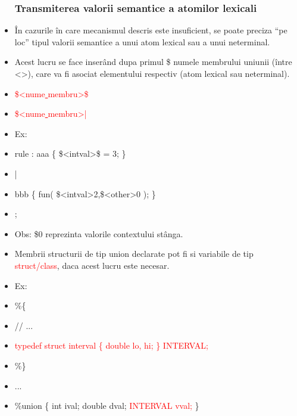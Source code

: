 \documentclass[pdf]{beamer}
\begin{document}
\begin{frame}
\begin{itemize}
\frametitle{Transmiterea valorii semantice a atomilor lexicali}
\item
În cazurile în care mecanismul descris este insuficient, se poate preciza “pe loc” tipul valorii semantice a unui atom lexical sau a unui neterminal.
\item
Acest lucru se face inserând dupa primul \$ numele membrului uniunii (între <>), care va fi asociat elementului respectiv (atom lexical sau neterminal).
\item
\textcolor{red}{\$<nume\underline{ }membru>\$}
\item
\textcolor{red}{\$<nume\underline{ }membru>|}
\item \vspace{5mm}
Ex:
\item
rule : aaa \{ \$<intval>\$ = 3; \}
\item \qquad
|
\item \qquad
bbb \{ fun( \$<intval>2,\$<other>0 ); \} 
\item \qquad
;
\item \vspace{5mm}
Obs: \$0 reprezinta valorile contextului stânga.

\end{itemize}
\end{frame}



\begin{frame}
\begin{itemize}
\frametitle{Transmiterea valorii semantice a atomilor lexicali}
\item
Membrii structurii de tip union declarate pot fi si variabile de tip \textcolor{red}{struct/class}, daca acest lucru este necesar.
\item \vspace{5mm}
Ex:
\item \vspace{5mm}
\%\{
\item
// ...
\item
\textcolor{red}{typedef struct interval \{ double lo, hi; \} INTERVAL;}
\item
\%\}
\item
...
\item
\%union \{ int ival; double dval; \textcolor{red}{INTERVAL vval;} \} 

\end{itemize}
\end{frame}
\end{document}
